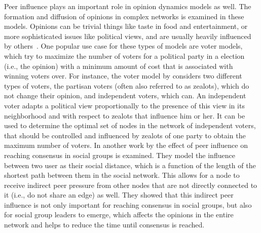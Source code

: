 Peer influence plays an important role in opinion dynamics models as well.
The formation and diffusion of opinions in complex networks is examined in these models.
Opinions can be trivial things like taste in food and entertainment, or more sophisticated issues like political views, and are usually heavily influenced by others~\cite{Acemoglu2011}.
One popular use case for these types of models are voter models, which try to maximize the number of voters for a political party in a election (i.e., the opinion) with a minimum amount of cost that is associated with winning voters over.
For instance, the voter model by \citet{Masuda2015} considers two different types of voters, the partisan voters (often also referred to as zealots), which do not change their opinion, and independent voters, which can.
An independent voter adapts a political view proportionally to the presence of this view in its neighborhood and with respect to zealots that influence him or her.
It can be used to determine the optimal set of nodes in the network of independent voters, that should be controlled and influenced by zealots of one party to obtain the maximum number of voters.
In another work by \citet{Estrada2013} the effect of peer influence on reaching consensus in social groups is examined.
They model the influence between two user as their social distance, which is a function of the length of the shortest path between them in the social network.
This allows for a node to receive indirect peer pressure from other nodes that are not directly connected to it (i.e., do not share an edge) as well.
They showed that this indirect peer influence is not only important for reaching consensus in social groups, but also for social group leaders to emerge, which affects the opinions in the entire network and helps to reduce the time until consensus is reached.

